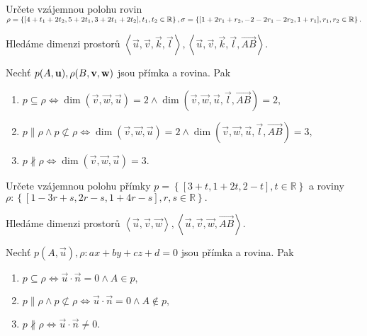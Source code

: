 \begin{priklad}
Určete vzájemnou polohu rovin $\rho = \left \{ [4+t_1+2t_2,5+2t_1,3+2t_1+2t_2],\linebreak t_1,t_2\in \mathbb R \right \} ,
\sigma = \left \{ [1+2r_1+r_2,-2-2r_1-2r_2,1+r_1],r_1,r_2\in \mathbb R \right \}. $
\end{priklad}

\begin{reseni}
Hledáme dimenzi prostorů $\left < \vec u, \vec v, \vec k, \vec l \right >, \left < \vec u, \vec v, \vec k, \vec l, \overrightarrow{AB} \right > .$
\end{reseni}

\begin{veta}
    Nechť $p(A,\vec u),\linebreak \rho(B,\vec v, \vec w)$ jsou přímka a rovina. Pak
    \begin{enumerate}[$i.$]
    \item $p\subseteq \rho \iff \dim (\vec v, \vec w, \vec u) = 2 \land \dim (\vec v, \vec w, \vec u, \vec l, \overrightarrow{AB})=2,$
   	\item $p \parallel \rho \land p \not\subset \rho \iff \dim (\vec v, \vec w, \vec u) = 2 \land \dim (\vec v, \vec w, \vec u, \vec l, \overrightarrow{AB})=3,$
   	\item $p \nparallel \rho \iff \dim (\vec v, \vec w, \vec u) = 3$.
    \end{enumerate}
\end{veta}

\begin{priklad}
Určete vzájemnou polohu přímky $p=\left \{ [3+t,1+2t,2-t],t \in \mathbb R \right \} $
a roviny $\rho:\left \{ [1-3r+s,2r-s,1+4r-s],r,s\in \mathbb R \right \} .$
\end{priklad}

\begin{reseni}
Hledáme dimenzi prostorů $\left < \vec u, \vec v, \vec w \right >, \left < \vec u, \vec v, \vec w,  \overrightarrow{AB} \right > .$
\end{reseni}

\begin{veta}
    Nechť $p(A,\vec u), \rho: ax+by+cz+d=0$ jsou přímka a rovina. Pak
    \begin{enumerate}[$i.$]
    \item $p\subseteq \rho \iff \vec u \cdot \vec n = 0\land A\in p,$
   	\item $p \parallel \rho \land p \not\subset \rho \iff \vec u\cdot \vec n = 0\land A\notin p,$
   	\item $p \nparallel \rho \iff \vec u\cdot \vec n\ne 0$.
    \end{enumerate}
\end{veta}

